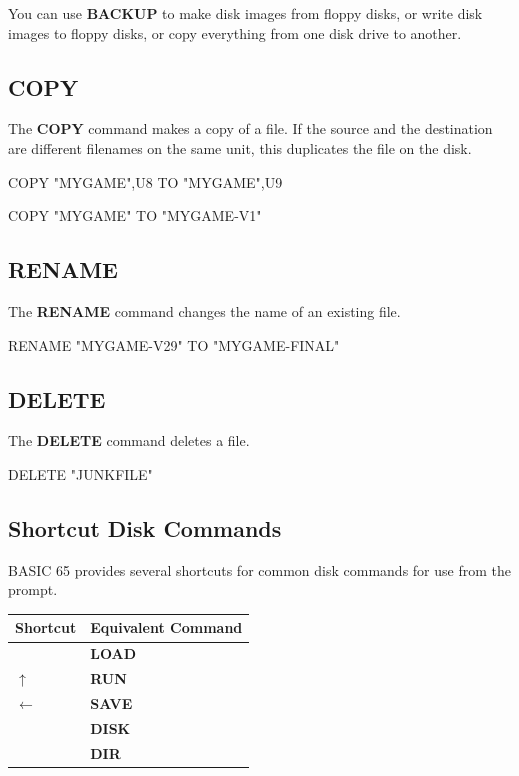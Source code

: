 You can use {\bf BACKUP} to make disk images from floppy disks, or write disk images to floppy disks, or copy everything from one disk drive to another.

\subsection{COPY}

The {\bf COPY} command makes a copy of a file. If the source and the destination are different filenames on the same unit, this duplicates the file on the disk.

\begin{screenoutput}
COPY "MYGAME",U8 TO "MYGAME",U9

COPY "MYGAME" TO "MYGAME-V1"
\end{screenoutput}

\subsection{RENAME}

The {\bf RENAME} command changes the name of an existing file.

\begin{screenoutput}
RENAME "MYGAME-V29" TO "MYGAME-FINAL"
\end{screenoutput}

\subsection{DELETE}

The {\bf DELETE} command deletes a file.

\begin{screenoutput}
DELETE "JUNKFILE"
\end{screenoutput}


\subsection{Shortcut Disk Commands}

BASIC 65 provides several shortcuts for common disk commands for use from the  prompt.

\begin{center}
\begin{tabular}{|l|l|}
\hline
{\bf Shortcut} & {\bf Equivalent Command} \\
\hline
\screentextwide{/} & {\bf LOAD} \\
\hline
$\uparrow$ & {\bf RUN} \\
\hline
$\leftarrow$ & {\bf SAVE} \\
\hline
\screentextwide{@} & {\bf DISK} \\
\hline
\screentextwide{\$} & {\bf DIR} \\
\hline
\end{tabular}
\end{center}

